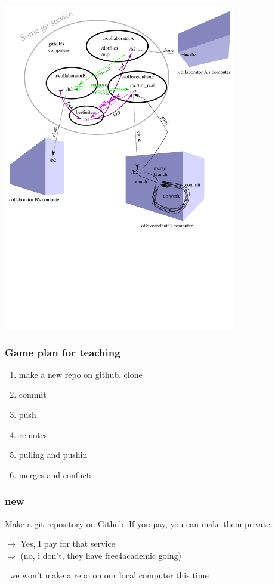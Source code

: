 \documentclass[14pt,aspectratio=1610]{beamer} %
\newcommand{\fframe}[2]{
   \begin{frame}
\frametitle{#1}
#2
\end{frame}
}
\begin{document}
\fframe{}
{\begin{center}\includegraphics[width=4in]{git_usage.pdf}\end{center}}


\fframe{Game plan for teaching}
{
	\begin{enumerate}
 
		\item make a new repo on github.  clone
		\item commit
		\item push 
		\item remotes
		\item pulling and pushin
		\item merges and conflicts

	\end{enumerate}
}



\fframe{new}
{Make a git repository on Github.  If you pay, you can make them private

\vspace{\baselineskip}

\qquad $\rightarrow$ Yes, I pay for that service \\
\qquad $\Rightarrow$ (no, i don't, they have free4academic going)

\vspace{\baselineskip}

🎯 we won't make a repo on our local computer this time
}
\end{document}
